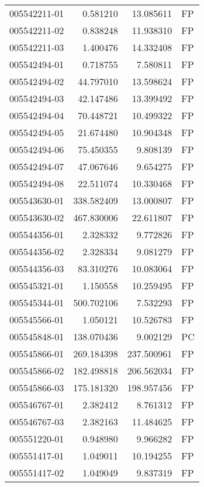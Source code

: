 \begin{tabular}{lrrl}
005542211-01 &    0.581210 &      13.085611 &   FP \\
005542211-02 &    0.838248 &      11.938310 &   FP \\
005542211-03 &    1.400476 &      14.332408 &   FP \\
005542494-01 &    0.718755 &       7.580811 &   FP \\
005542494-02 &   44.797010 &      13.598624 &   FP \\
005542494-03 &   42.147486 &      13.399492 &   FP \\
005542494-04 &   70.448721 &      10.499322 &   FP \\
005542494-05 &   21.674480 &      10.904348 &   FP \\
005542494-06 &   75.450355 &       9.808139 &   FP \\
005542494-07 &   47.067646 &       9.654275 &   FP \\
005542494-08 &   22.511074 &      10.330468 &   FP \\
005543630-01 &  338.582409 &      13.000807 &   FP \\
005543630-02 &  467.830006 &      22.611807 &   FP \\
005544356-01 &    2.328332 &       9.772826 &   FP \\
005544356-02 &    2.328334 &       9.081279 &   FP \\
005544356-03 &   83.310276 &      10.083064 &   FP \\
005545321-01 &    1.150558 &      10.259495 &   FP \\
005545344-01 &  500.702106 &       7.532293 &   FP \\
005545566-01 &    1.050121 &      10.526783 &   FP \\
005545848-01 &  138.070436 &       9.002129 &   PC \\
005545866-01 &  269.184398 &     237.500961 &   FP \\
005545866-02 &  182.498818 &     206.562034 &   FP \\
005545866-03 &  175.181320 &     198.957456 &   FP \\
005546767-01 &    2.382412 &       8.761312 &   FP \\
005546767-03 &    2.382163 &      11.484625 &   FP \\
005551220-01 &    0.948980 &       9.966282 &   FP \\
005551417-01 &    1.049011 &      10.194255 &   FP \\
005551417-02 &    1.049049 &       9.837319 &   FP \\

\end{tabular}
